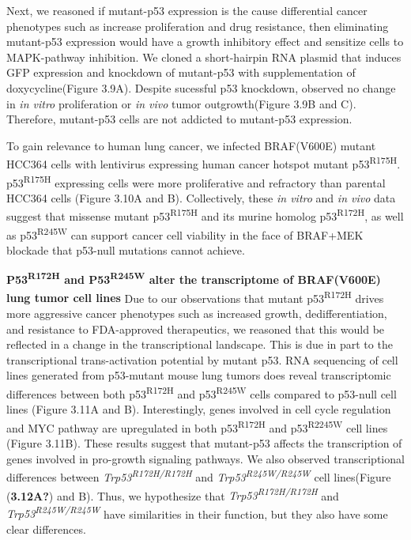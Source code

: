 Next, we reasoned if mutant-p53 expression is the cause differential cancer phenotypes such as increase proliferation and drug resistance, then eliminating mutant-p53 expression would have a growth inhibitory effect and sensitize cells to MAPK-pathway inhibition. We cloned a short-hairpin RNA plasmid that induces GFP expression and knockdown of mutant-p53 with supplementation of doxycycline(Figure 3.9A). Despite sucessful p53 knockdown, observed no change in \emph{in vitro} proliferation or \emph{in vivo} tumor outgrowth(Figure 3.9B and C). Therefore, mutant-p53 cells are not addicted to mutant-p53 expression.

To gain relevance to human lung cancer, we infected BRAF(V600E) mutant HCC364 cells with lentivirus expressing human cancer hotspot mutant p53\textsuperscript{R175H}. p53\textsuperscript{R175H} expressing cells were more proliferative and refractory than parental HCC364 cells (Figure 3.10A and B). Collectively, these \emph{in vitro} and \emph{in vivo} data suggest that missense mutant p53\textsuperscript{R175H} and its murine homolog p53\textsuperscript{R172H}, as well as p53\textsuperscript{R245W} can support cancer cell viability in the face of BRAF+MEK blockade that p53-null mutations cannot achieve.

\textbf{P53\textsuperscript{R172H} and P53\textsuperscript{R245W} alter the transcriptome of BRAF(V600E) lung tumor cell lines}
Due to our observations that mutant p53\textsuperscript{R172H} drives more aggressive cancer phenotypes such as increased growth, dedifferentiation, and resistance to FDA-approved therapeutics, we reasoned that this would be reflected in a change in the transcriptional landscape. This is due in part to the transcriptional trans-activation potential by mutant p53. RNA sequencing of cell lines generated from p53-mutant mouse lung tumors does reveal transcriptomic differences between both p53\textsuperscript{R172H} and p53\textsuperscript{R245W} cells compared to p53-null cell lines (Figure 3.11A and B). Interestingly, genes involved in cell cycle regulation and MYC pathway are upregulated in both p53\textsuperscript{R172H} and p53\textsuperscript{R2245W} cell lines (Figure 3.11B). These results suggest that mutant-p53 affects the transcription of genes involved in pro-growth signaling pathways. We also observed transcriptional differences between \emph{Trp53\textsuperscript{R172H/R172H}} and \emph{Trp53\textsuperscript{R245W/R245W}} cell lines(Figure (\textbf{3.12A?}) and B). Thus, we hypothesize that \emph{Trp53\textsuperscript{R172H/R172H}} and \emph{Trp53\textsuperscript{R245W/R245W}} have similarities in their function, but they also have some clear differences.

